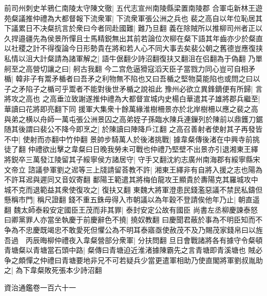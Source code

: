前司州刺史羊鴉仁南陵太守陳文徹|{
	五代志宣州南陵縣梁置南陵郡}
合軍屯新林王遊苑粲議推仲禮為大都督報下流衆軍|{
	下流衆軍張公洲之兵也}
裴之高自以年位恥居其下議累日不决粲抗言於衆曰今者同赴國難|{
	難乃旦翻}
義在除賊所以推柳司州者正以久捍邉疆先為侯景所憚且士馬精鋭無出其前若論位次柳在粲下語其年齒亦少於粲直以社稷之計不得復論今日形勢貴在將和若人心不同大事去矣裴公朝之舊德豈應復挟私情以沮大計粲請為諸軍解之|{
	語牛倨翻少詩沼翻復扶又翻沮在侣翻為于偽翻}
乃單舸至之高營切讓之曰|{
	舸古我翻}
今二宫危逼猾寇滔天臣子當戮力同心豈可自相矛楯|{
	韓非子有鬻矛楯者曰吾矛之利物無不陷也又曰吾楯之堅物莫能陷也或問之曰以子之矛陷子之楯可乎鬻者不能對後世矛楯之說祖此}
豫州必欲立異鋒鏑便有所歸|{
	言將攻之高也}
之高垂泣致謝遂推仲禮為大都督宣城内史楊白華遣其子雄將郡兵繼至|{
	華讀曰花將即亮翻下同}
援軍大集衆十餘萬緣淮樹柵景亦於北岸樹柵以應之裴之高與弟之横以舟師一萬屯張公洲景囚之高弟姪子孫臨水陳兵連鏁列於陳前以鼎鑊刀鋸随其後謂曰裴公不降今即烹之|{
	於陳讀曰陣降戶江翻}
之高召善射者使射其子再發皆不中|{
	使射而亦翻中竹仲翻}
景帥步騎萬人於後渚挑戰|{
	據韋粲傳後渚在中興寺前挑徒了翻}
仲禮欲出擊之韋粲曰日晚我勞未可戰也仲禮乃堅壁不出景亦引退湘東王繹將鋭卒三萬發江陵留其子綏寧侯方諸居守|{
	守手又翻沈約志廣州南海郡有綏寧縣宋文帝立}
諮議參軍劉之迡等三上牋請留荅教不許|{
	湘東王繹非有自將入援之志也陽為不許耳迡與遲同又音奴寄翻}
鄱陽王範遣其將梅伯龍攻王顯貴於夀陽克其羅城攻中城不克而退範益其衆使復攻之|{
	復扶又翻}
東魏大將軍澄患民錢濫惡議不禁民私鑄但懸稱市門|{
	稱尺證翻}
錢不重五銖毋得入市朝議以為年穀不登請俟他年乃止|{
	朝直遥翻}
魏太師泰殺安定國臣王茂而非其罪|{
	泰封安定公故有國臣}
尚書左丞柳慶諫泰怒曰卿黨罪人亦當坐執慶于前慶辭色不撓|{
	撓奴教翻}
曰慶聞君蔽於事為不明臣知而不争為不忠慶既竭忠不敢愛死但懼公為不明耳泰寤亟使赦茂不及乃賜茂家錢帛曰以旌吾過　丙辰晦柳仲禮夜入韋粲營部分衆軍|{
	分扶問翻}
旦日會戰諸將各有據守令粲頓青塘粲以青塘當石頭中路|{
	粲傳曰青塘迫近淮渚據陳霸先之言青塘即青溪塘也}
賊必争之頗憚之仲禮曰青塘要地非兄不可若疑兵少當更遣軍相助乃使直閣將軍劉叔胤助之|{
	為下韋粲敗死張本少詩沼翻}


資治通鑑卷一百六十一
